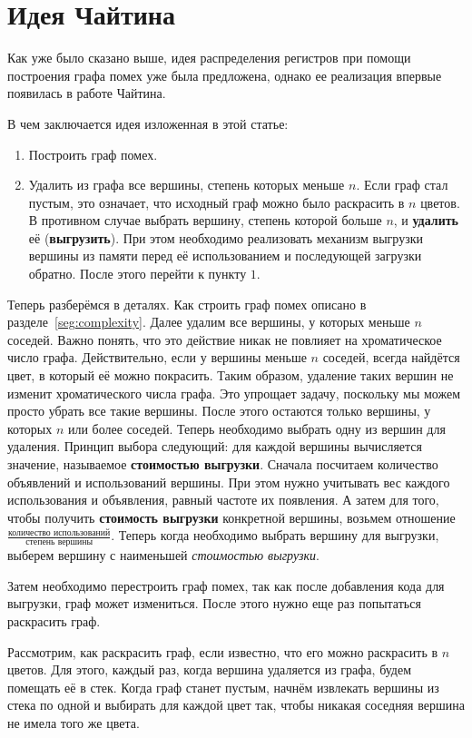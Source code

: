 \documentclass[12pt]{article}
\begin{document}
\section{Идея Чайтина}
Как уже было сказано выше, идея распределения регистров при помощи построения графа помех уже была
предложена, однако ее реализация впервые появилась в работе Чайтина.

В чем заключается идея изложенная в этой статье:
\begin{enumerate}
    \item Построить граф помех.
    \item Удалить из графа все вершины, степень которых меньше $n$. Если граф стал пустым, это означает, что исходный
    граф можно было раскрасить в $n$ цветов. В противном случае выбрать вершину, степень которой больше $n$, и \textbf{удалить}
    её (\textbf{выгрузить}). При этом необходимо реализовать механизм выгрузки вершины из памяти перед её использованием и
    последующей загрузки обратно. После этого перейти к пункту $1$.
\end{enumerate}

Теперь разберёмся в деталях. Как строить граф помех описано в разделе~\ref{seg:complexity}. Далее удалим все вершины, у
которых меньше $n$ соседей. Важно понять, что это действие никак не повлияет на хроматическое число графа. Действительно,
если у вершины меньше $n$ соседей, всегда найдётся цвет, в который её можно покрасить. Таким образом, удаление таких вершин
не изменит хроматического числа графа. Это упрощает задачу, поскольку мы можем просто убрать все такие вершины. После этого
остаются только вершины, у которых $n$ или более соседей. Теперь необходимо выбрать одну из вершин для удаления. Принцип выбора
следующий: для каждой вершины вычисляется значение, называемое \textbf{стоимостью выгрузки}. Сначала посчитаем количество
объявлений и использований вершины. При этом нужно учитывать вес каждого использования и объявления, равный частоте их появления.
А затем для того, чтобы получить \textbf{стоимость выгрузки} конкретной вершины, возьмем отношение
$\frac{\textit{количество использований}}{\textit{степень вершины}}$. Теперь когда необходимо выбрать вершину для выгрузки,
выберем вершину с наименьшей \textit{стоимостью выгрузки}.

Затем необходимо перестроить граф помех, так как после добавления кода для выгрузки, граф может измениться. После этого нужно
еще раз попытаться раскрасить граф.

Рассмотрим, как раскрасить граф, если известно, что его можно раскрасить в $n$ цветов. Для этого, каждый раз, когда вершина
удаляется из графа, будем помещать её в стек. Когда граф станет пустым, начнём извлекать вершины из стека по одной и выбирать
для каждой цвет так, чтобы никакая соседняя вершина не имела того же цвета. 
\end{document}
